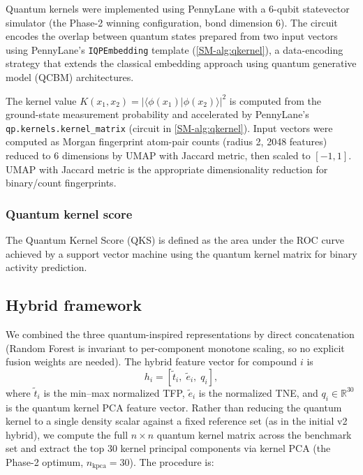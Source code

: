 \documentclass[11pt,a4paper]{article}
\begin{document}
Quantum kernels were implemented using PennyLane \citep{pennylane_2024} with a 6-qubit statevector simulator (the Phase-2 winning configuration, bond dimension 6). The circuit encodes the overlap between quantum states prepared from two input vectors using PennyLane's \texttt{IQPEmbedding} template (\cref{SM-alg:qkernel}), a data-encoding strategy that extends the classical embedding approach using quantum generative model (QCBM) architectures.

The kernel value $K(x_1, x_2) = |\langle \phi(x_1) | \phi(x_2) \rangle|^2$ is computed from the ground-state measurement probability and accelerated by PennyLane's \texttt{qp.kernels.kernel\_matrix} (circuit in \cref{SM-alg:qkernel}). Input vectors were computed as Morgan fingerprint atom-pair counts (radius 2, \num{2048} features) reduced to 6 dimensions by UMAP with Jaccard metric, then scaled to $[-1, 1]$. UMAP with Jaccard metric is the appropriate dimensionality reduction for binary/count fingerprints.

\subsubsection{Quantum kernel score}

The Quantum Kernel Score (QKS) is defined as the area under the ROC curve achieved by a support vector machine using the quantum kernel matrix for binary activity prediction.

\subsection{Hybrid framework}

We combined the three quantum-inspired representations by direct concatenation (Random Forest is invariant to per-component monotone scaling, so no explicit fusion weights are needed). The hybrid feature vector for compound $i$ is
\begin{equation}
h_i = \left[\tilde{t}_i,\; \tilde{e}_i,\; q_i\right],
\end{equation}
where $\tilde{t}_i$ is the min--max normalized TFP, $\tilde{e}_i$ is the normalized TNE, and $q_i \in \mathbb{R}^{30}$ is the quantum kernel PCA feature vector. Rather than reducing the quantum kernel to a single density scalar against a fixed reference set (as in the initial v2 hybrid), we compute the full $n \times n$ quantum kernel matrix across the benchmark set and extract the top \num{30} kernel principal components via kernel PCA (the Phase-2 optimum, $n_{\text{kpca}}=30$). The procedure is:
\end{document}
